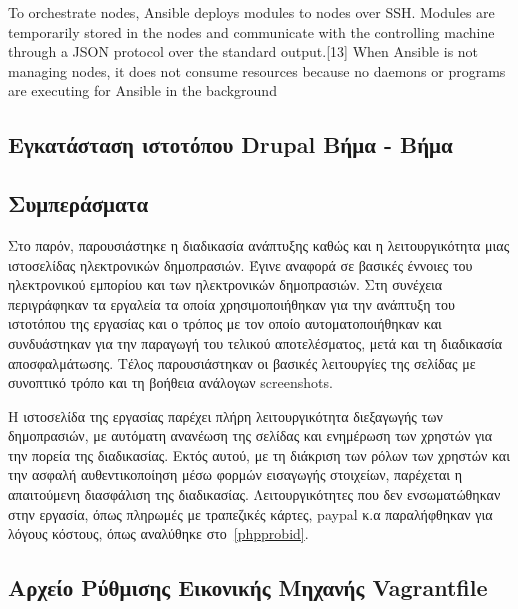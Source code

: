 \documentclass[12pt]{report}
\begin{document}
To orchestrate nodes, Ansible deploys modules to nodes over SSH. Modules are temporarily stored in the nodes and communicate with the controlling machine through a JSON protocol over the standard output.[13] When Ansible is not managing nodes, it does not consume resources because no daemons or programs are executing for Ansible in the background
\section{Εγκατάσταση ιστοτόπου \textlatin{Drupal} Βήμα - Βήμα}\label{manual_setup}

\section{Συμπεράσματα}
Στο παρόν, παρουσιάστηκε η διαδικασία ανάπτυξης καθώς και η λειτουργικότητα μιας ιστοσελίδας ηλεκτρονικών δημοπρασιών. Έγινε αναφορά σε βασικές έννοιες του ηλεκτρονικού εμπορίου και των ηλεκτρονικών δημοπρασιών. Στη συνέχεια περιγράφηκαν τα εργαλεία τα οποία χρησιμοποιήθηκαν για την ανάπτυξη του ιστοτόπου της εργασίας και ο τρόπος με τον οποίο αυτοματοποιήθηκαν και συνδυάστηκαν για την παραγωγή του τελικού αποτελέσματος, μετά και τη διαδικασία αποσφαλμάτωσης. Τέλος παρουσιάστηκαν οι βασικές λειτουργίες της σελίδας με συνοπτικό τρόπο και τη βοήθεια ανάλογων \textlatin{screenshots}.

Η ιστοσελίδα της εργασίας παρέχει πλήρη λειτουργικότητα διεξαγωγής των δημοπρασιών, με αυτόματη ανανέωση της σελίδας και ενημέρωση των χρηστών για την πορεία της διαδικασίας. Εκτός αυτού, με τη διάκριση των ρόλων των χρηστών και την ασφαλή αυθεντικοποίηση μέσω φορμών εισαγωγής στοιχείων, παρέχεται η απαιτούμενη διασφάλιση της διαδικασίας. Λειτουργικότητες που δεν ενσωματώθηκαν στην εργασία, όπως πληρωμές με τραπεζικές κάρτες, \textlatin{paypal} κ.α παραλήφθηκαν για λόγους κόστους, όπως αναλύθηκε στο~\ref{phpprobid}.


\begin{appendices}
\chapter{Αρχείο Ρύθμισης Εικονικής Μηχανής \textlatin{Vagrantfile}}\label{AppA}
\inputminted[linenos, fontsize=\scriptsize, breaklines, baselinestretch=1]{ruby}{sources/Vagrantfile}
\end{appendices}

\appendix



\end{document}
